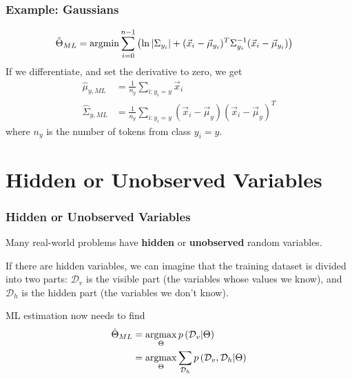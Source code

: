 \documentclass{beamer}
\newcommand{\argmax}{\operatornamewithlimits{argmax}}
\newcommand{\argmin}{\operatornamewithlimits{argmin}}
\begin{document}
\begin{frame}
  \frametitle{Example: Gaussians}
  \begin{align*}
    \hat{\Theta}_{ML}
    &= \argmin \sum_{i=0}^{n-1}\left(\ln|\Sigma_{y_i}|
    +(\vec{x}_i-\vec\mu_{y_i})^T\Sigma_{y_i}^{-1}(\vec{x}_i-\vec\mu_{y_i})\right)
  \end{align*}
  If we differentiate, and set the derivative to zero, we get
  \begin{align*}
    \hat\mu_{y,ML} &= \frac{1}{n_y}\sum_{i:y_i=y}\vec{x}_i\\
    \hat\Sigma_{y,ML} &= \frac{1}{n_y}\sum_{i:y_i=y}(\vec{x}_i-\vec\mu_y)(\vec{x}_i-\vec\mu_y)^T
  \end{align*}
  where $n_y$ is the number of tokens from class $y_i=y$.
\end{frame}

\section[Hidden]{Hidden or Unobserved Variables}
\setcounter{subsection}{1}

\begin{frame}
  \frametitle{Hidden or Unobserved Variables}

  Many real-world problems have {\bf hidden} or {\bf unobserved}
  random variables.

  If there are hidden variables, we can imagine that the training
  dataset is divided into two parts: ${\mathcal D}_v$ is the visible
  part (the variables whose values we know), and ${\mathcal D}_h$ is
  the hidden part (the variables we don't know).

  ML estimation now needs to find
  \begin{align*}
    \hat\Theta_{ML}
    &= \argmax_\Theta p\left({\mathcal D}_v|\Theta\right)\\
    &= \argmax_\Theta\sum_{{\mathcal D}_h}p\left({\mathcal D}_v,{\mathcal D}_h|\Theta\right)
  \end{align*}
\end{frame}
\end{document}

